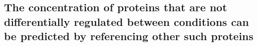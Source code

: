 \subsection{The concentration of proteins that are not differentially regulated between conditions can be predicted by referencing other such proteins}